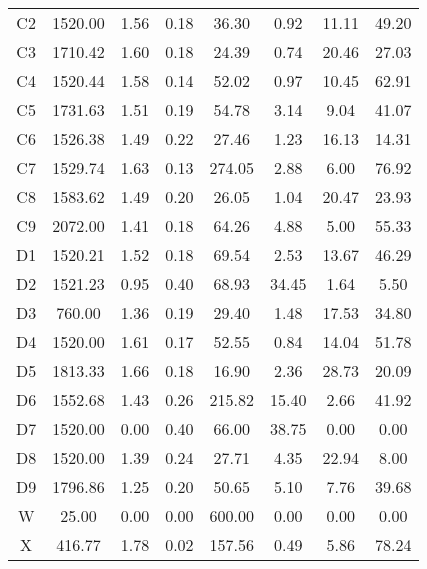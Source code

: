 \begin{table}[h!]
\begin{tabular}{c c c c c c c c}
			C2	 & 	1520.00	 & 	1.56	 & 	0.18	 & 	36.30	 & 	0.92	 & 	11.11	 & 	49.20 \\
			C3	 & 	1710.42	 & 	1.60	 & 	0.18	 & 	24.39	 & 	0.74	 & 	20.46	 & 	27.03 \\
			C4	 & 	1520.44	 & 	1.58	 & 	0.14	 & 	52.02	 & 	0.97	 & 	10.45	 & 	62.91 \\
			C5	 & 	1731.63	 & 	1.51	 & 	0.19	 & 	54.78	 & 	3.14	 & 	9.04	 & 	41.07 \\
			C6	 & 	1526.38	 & 	1.49	 & 	0.22	 & 	27.46	 & 	1.23	 & 	16.13	 & 	14.31 \\
			C7	 & 	1529.74	 & 	1.63	 & 	0.13	 & 	274.05	 & 	2.88	 & 	6.00	 & 	76.92 \\
			C8	 & 	1583.62	 & 	1.49	 & 	0.20	 & 	26.05	 & 	1.04	 & 	20.47	 & 	23.93 \\
			C9	 & 	2072.00	 & 	1.41	 & 	0.18	 & 	64.26	 & 	4.88	 & 	5.00	 & 	55.33 \\
			D1	 & 	1520.21	 & 	1.52	 & 	0.18	 & 	69.54	 & 	2.53	 & 	13.67	 & 	46.29 \\
			D2	 & 	1521.23	 & 	0.95	 & 	0.40	 & 	68.93	 & 	34.45	 & 	1.64	 & 	5.50 \\
			D3	 & 	760.00	 & 	1.36	 & 	0.19	 & 	29.40	 & 	1.48	 & 	17.53	 & 	34.80 \\
			D4	 & 	1520.00	 & 	1.61	 & 	0.17	 & 	52.55	 & 	0.84	 & 	14.04	 & 	51.78 \\
			D5	 & 	1813.33	 & 	1.66	 & 	0.18	 & 	16.90	 & 	2.36	 & 	28.73	 & 	20.09 \\
			D6	 & 	1552.68	 & 	1.43	 & 	0.26	 & 	215.82	 & 	15.40	 & 	2.66	 & 	41.92 \\
			D7	 & 	1520.00	 & 	0.00	 & 	0.40	 & 	66.00	 & 	38.75	 & 	0.00	 & 	0.00 \\
			D8	 & 	1520.00	 & 	1.39	 & 	0.24	 & 	27.71	 & 	4.35	 & 	22.94	 & 	8.00 \\
			D9	 & 	1796.86	 & 	1.25	 & 	0.20	 & 	50.65	 & 	5.10	 & 	7.76	 & 	39.68 \\
			W	 & 	25.00	 & 	0.00	 & 	0.00	 & 	600.00	 & 	0.00	 & 	0.00	 & 	0.00 \\
			X	 & 	416.77	 & 	1.78	 & 	0.02	 & 	157.56	 & 	0.49	 & 	5.86	 & 	78.24 \\
			\hline		
		\end{tabular}
		
		\label{table:soil_prop}
	\end{table}	
	